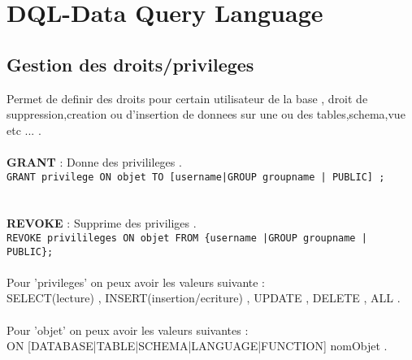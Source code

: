 \documentclass[a4paper,12pt,openany]{book}
\begin{document}

\chapter{DQL-Data Query Language}
\section{Gestion des droits/privileges}
Permet de definir des droits pour certain utilisateur de la base , droit de suppression,creation ou d'insertion de donnees sur une ou des tables,schema,vue etc ... . \\
\\
\textbf{GRANT} : Donne des privilileges .\\
\verb+GRANT privilege ON objet TO [username|GROUP groupname | PUBLIC] ;+\\
\\
\\
\textbf{REVOKE} : Supprime des priviliges .\\
\verb+REVOKE privilileges ON objet FROM {username |GROUP groupname | PUBLIC};+\\
\\
Pour 'privileges' on peux avoir les valeurs suivante : \\
SELECT(lecture) , INSERT(insertion/ecriture) , UPDATE , DELETE , ALL .\\
\\
Pour 'objet' on peux avoir les valeurs suivantes : \\
ON [DATABASE|TABLE|SCHEMA|LANGUAGE|FUNCTION] nomObjet .\\
\\
\end{document}
